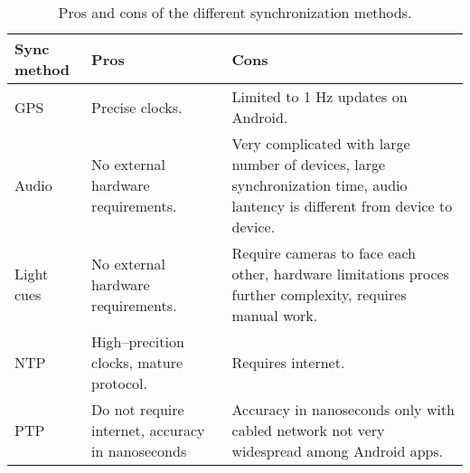 \begin{table}
    \begin{tabularx}{\textwidth}{XXX}\toprule
        \textbf{Sync method} & \textbf{Pros} & \textbf{Cons} \\ \midrule
        GPS     & Precise clocks. & Limited to 1 Hz updates on Android. \\
        Audio   & No external hardware requirements. & Very complicated with large number of devices, \newline large synchronization time, \newline audio lantency is different from device to device. \\
        Light cues & No external hardware requirements. & Require cameras to face each other, \newline hardware limitations proces further complexity, \newline requires manual work. \\
        \ac{NTP} & High--precition clocks, \newline mature protocol. & Requires internet. \\
        \ac{PTP} & Do not require internet, \newline accuracy in nanoseconds & Accuracy in nanoseconds only with cabled network \newline not very widespread among Android apps. \\ \bottomrule
    \end{tabularx}
    \caption{Pros and cons of the different synchronization methods.}
    \label{tab:pros_cons_sync}
\end{table}
